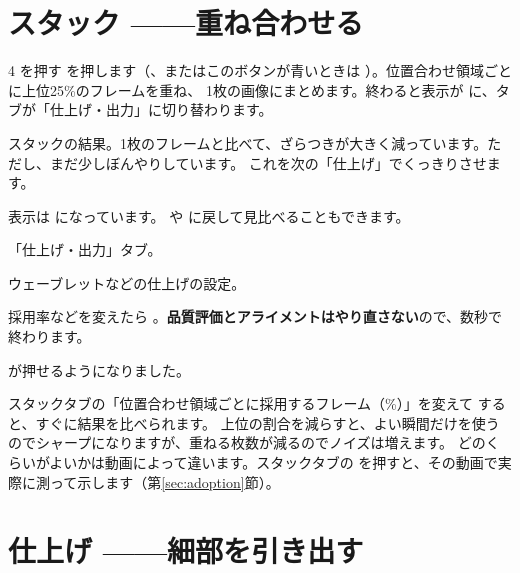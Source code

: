 \section{スタック ——重ね合わせる}\label{sec:qs-stack}

\begin{step}{4}{ を押す}
   を押します（、またはこのボタンが青いときは ）。位置合わせ領域ごとに上位25\%のフレームを重ね、
  1枚の画像にまとめます。終わると表示が  に、タブが「仕上げ・出力」に切り替わります。
\end{step}


\begin{marklist}
  \item スタックの結果。1枚のフレームと比べて、ざらつきが大きく減っています。ただし、まだ少しぼんやりしています。
        これを次の「仕上げ」でくっきりさせます。
  \item 表示は  になっています。 や  に戻して見比べることもできます。
  \item 「仕上げ・出力」タブ。
  \item ウェーブレットなどの仕上げの設定。
  \item 採用率などを変えたら 。\textbf{品質評価とアライメントはやり直さない}ので、数秒で終わります。
  \item {} が押せるようになりました。
\end{marklist}

\begin{tip}[採用率を変えて試す]
  スタックタブの「位置合わせ領域ごとに採用するフレーム（\%）」を変えて  すると、すぐに結果を比べられます。
  上位の割合を減らすと、よい瞬間だけを使うのでシャープになりますが、重ねる枚数が減るのでノイズは増えます。
  どのくらいがよいかは動画によって違います。スタックタブの  を押すと、その動画で実際に測って示します（第\ref{sec:adoption}節）。
\end{tip}

\section{仕上げ ——細部を引き出す}\label{sec:qs-finish}

